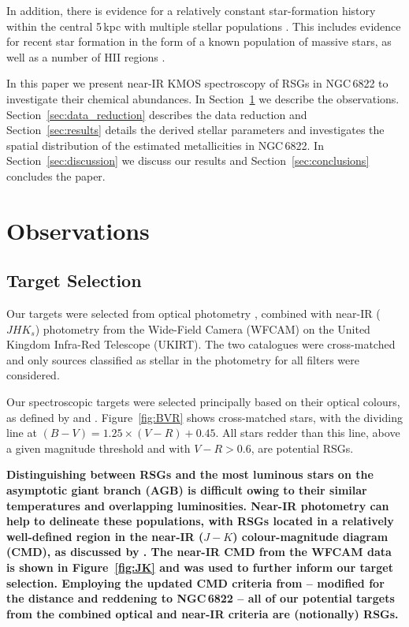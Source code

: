 \documentclass[iop]{emulateapj}
\begin{document}
In addition, there is evidence for a relatively constant star-formation history within the central 5\,kpc
\citep{2014ApJ...789..147W}
with multiple stellar populations
\citep{2006A&A...451...99B,2012A&A...540A.135S}.
This includes evidence for recent star formation in the form of a known population of massive stars, as well as a number of HII regions
\citep{2001ApJ...547..765V,2006AJ....131..343D,2009A&A...505.1027H,2012AJ....144....2L}.

In this paper we present near-IR KMOS spectroscopy of RSGs in NGC\,6822 to investigate their chemical abundances.
In Section~\ref{sec:observations} we describe the observations.
Section~\ref{sec:data_reduction} describes the data reduction and
Section~\ref{sec:results} details the derived stellar parameters and investigates the spatial distribution of the estimated metallicities in NGC\,6822.
In Section~\ref{sec:discussion} we discuss our results and
Section~\ref{sec:conclusions} concludes the paper.


\section{Observations}
\label{sec:observations}

\subsection{Target Selection} %
\label{sub:target_selection}

Our targets were selected from optical photometry
\citep{2007AJ....134.2474M}, combined with near-IR ($JHK{_s}$) photometry
\cite[for details see][]{2012A&A...540A.135S} from the Wide-Field Camera (WFCAM) on the United Kingdom Infra-Red Telescope (UKIRT).
The two catalogues were cross-matched and only sources classified as stellar in the photometry for all filters were considered.

Our spectroscopic targets were selected principally based on their optical colours, as defined by
\cite{1998ApJ...501..153M} and
\cite{2012AJ....144....2L}.
Figure~\ref{fig:BVR} shows cross-matched stars, with the dividing line at $(B - V) = 1.25 \times (V - R)+0.45$.
All stars redder than this line, above a given magnitude threshold and with $V - R > 0.6$, are potential RSGs.

\textbf{Distinguishing between RSGs and the most luminous stars on the asymptotic giant branch
(AGB) is difficult owing to their similar temperatures and overlapping luminosities.
Near-IR photometry can help to delineate these populations,
with RSGs located in a relatively well-defined region in the near-IR ($J-K$) colour-magnitude diagram (CMD), as discussed by
\cite{2000ApJ...542..804N}.
The near-IR CMD from the WFCAM data is shown in
Figure~\ref{fig:JK} and was used to further inform our target selection.
Employing the updated CMD criteria from
\cite{2014A&A...562A..32C}  -- modified for the distance and reddening to NGC\,6822 --
all of our potential targets from the combined optical and near-IR criteria are (notionally) RSGs.}
\end{document}
